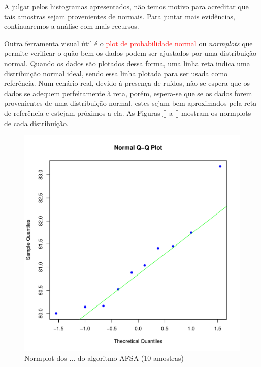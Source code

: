 \documentclass[conference]{IEEEtran}
\begin{document}
A julgar pelos histogramas apresentados, não temos motivo para acreditar que tais amostras sejam provenientes de normais.
Para juntar mais evidências, continuaremos a análise com mais recursos.

Outra ferramenta visual útil é o \textcolor{red}{plot de probabilidade normal} ou \textit{normplots} que permite verificar o quão bem os dados podem ser ajustados por uma distribuição normal.
Quando os dados são plotados dessa forma, uma linha reta indica uma distribuição normal ideal, sendo essa linha plotada para ser usada como referência.
Num cenário real, devido à presença de ruídos, não se espera que os dados se adequem perfeitamente à reta, porém, espera-se que se os dados forem provenientes de uma distribuição normal, estes sejam bem aproximados pela reta de referência e estejam próximos a ela.
As Figuras \ref{} a \ref{} mostram os normplots de cada distribuição.

\begin{figure}[h]
	\centering
	\includegraphics[width=\linewidth]{img/bluenorm_afsa.pdf}
	\caption{Normplot dos ... do algoritmo AFSA (10 amostras)}
	\label{fig:hist_afsa}
\end{figure}
\end{document}

